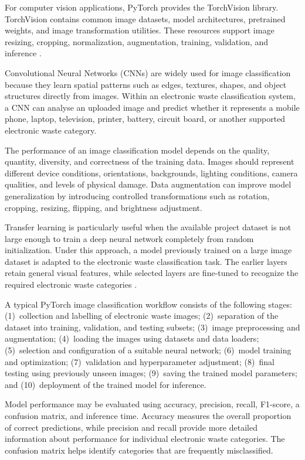 For computer vision applications, PyTorch provides the TorchVision library.
TorchVision contains common image datasets, model architectures, pretrained
weights, and image transformation utilities. These resources support image
resizing, cropping, normalization, augmentation, training, validation, and
inference \citep{pytorch2026torchvision}.

Convolutional Neural Networks (CNNs) are widely used for image classification
because they learn spatial patterns such as edges, textures, shapes, and object
structures directly from images. Within an electronic waste classification system,
a CNN can analyse an uploaded image and predict whether it represents a mobile
phone, laptop, television, printer, battery, circuit board, or another supported
electronic waste category.

The performance of an image classification model depends on the quality,
quantity, diversity, and correctness of the training data. Images should represent
different device conditions, orientations, backgrounds, lighting conditions, camera
qualities, and levels of physical damage. Data augmentation can improve model
generalization by introducing controlled transformations such as rotation,
cropping, resizing, flipping, and brightness adjustment.

Transfer learning is particularly useful when the available project dataset is
not large enough to train a deep neural network completely from random
initialization. Under this approach, a model previously trained on a large image
dataset is adapted to the electronic waste classification task. The earlier layers
retain general visual features, while selected layers are fine-tuned to recognize
the required electronic waste categories \citep{chilamkurthy2025}.

A typical PyTorch image classification workflow consists of the following
stages: (1)~collection and labelling of electronic waste images; (2)~separation of
the dataset into training, validation, and testing subsets; (3)~image preprocessing
and augmentation; (4)~loading the images using datasets and data loaders;
(5)~selection and configuration of a suitable neural network; (6)~model training
and optimization; (7)~validation and hyperparameter adjustment; (8)~final testing
using previously unseen images; (9)~saving the trained model parameters; and
(10)~deployment of the trained model for inference.

Model performance may be evaluated using accuracy, precision, recall,
F1-score, a confusion matrix, and inference time. Accuracy measures the overall
proportion of correct predictions, while precision and recall provide more
detailed information about performance for individual electronic waste
categories. The confusion matrix helps identify categories that are frequently
misclassified.

